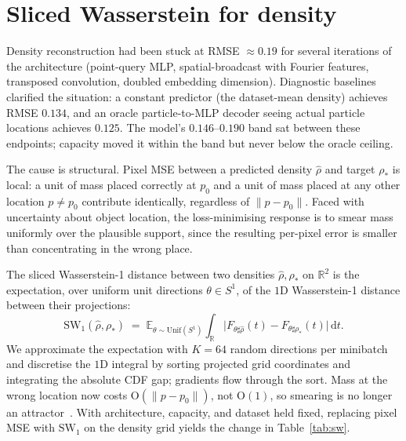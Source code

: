\documentclass[11pt]{article}
\newcommand{\R}{\mathbb{R}}
\newcommand{\E}{\mathbb{E}}
\newcommand{\SW}{\mathrm{SW}}
\begin{document}
\section{Sliced Wasserstein for density}
\label{sec:sw}

Density reconstruction had been stuck at RMSE $\approx 0.19$ for several iterations of the architecture (point-query MLP, spatial-broadcast with Fourier features, transposed convolution, doubled embedding dimension). Diagnostic baselines clarified the situation: a constant predictor (the dataset-mean density) achieves RMSE $0.134$, and an oracle particle-to-MLP decoder seeing actual particle locations achieves $0.125$. The model's $0.146$--$0.190$ band sat between these endpoints; capacity moved it within the band but never below the oracle ceiling.

The cause is structural. Pixel MSE between a predicted density $\hat\rho$ and target $\rho_*$ is local: a unit of mass placed correctly at $p_0$ and a unit of mass placed at any other location $p \ne p_0$ contribute identically, regardless of $\|p - p_0\|$. Faced with uncertainty about object location, the loss-minimising response is to smear mass uniformly over the plausible support, since the resulting per-pixel error is smaller than concentrating in the wrong place.

The sliced Wasserstein-1 distance between two densities $\hat\rho, \rho_*$ on $\R^2$ is the expectation, over uniform unit directions $\theta \in S^1$, of the $1$D Wasserstein-1 distance between their projections:
\begin{equation}
  \SW_1(\hat\rho, \rho_*) \;=\; \E_{\theta \sim \mathrm{Unif}(S^1)} \int_{\R} \big| F_{\theta\sharp \hat\rho}(t) - F_{\theta\sharp \rho_*}(t) \big| \,\mathrm{d}t.
\end{equation}
We approximate the expectation with $K = 64$ random directions per minibatch and discretise the $1$D integral by sorting projected grid coordinates and integrating the absolute CDF gap; gradients flow through the sort. Mass at the wrong location now costs $\mathrm{O}(\|p - p_0\|)$, not $\mathrm{O}(1)$, so smearing is no longer an attractor~\cite{rabin2011wasserstein, deshpande2018gswd, kolouri2019sliced, villani2008optimal}. With architecture, capacity, and dataset held fixed, replacing pixel MSE with $\SW_1$ on the density grid yields the change in Table~\ref{tab:sw}.
\end{document}
